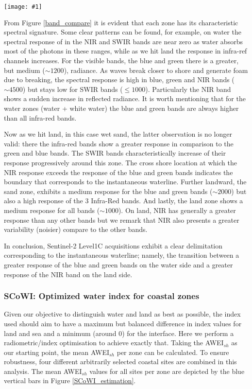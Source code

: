 \documentclass[remotesensing,article,submit,pdftex,moreauthors]{Definitions/mdpi}
\newcommand{\myfigure}[4]{
    \begin{figure*}[h!]
        \centering
        \texttt{[image: \#1]}	 
        \caption{\itshape#2}
        \label{#3}
    \end{figure*} 
}
\begin{document}
\myfigure{img/band_compare_CAPBRETON.png}{Example of the spectral response along the 5 cross shore zones. The instantaneous waterline (land/water limit marker) is our target here.}{band_compare}{1}

From Figure \ref{band_compare} it is evident that each zone has its characteristic spectral signature. Some clear patterns can be found, for example, on water the spectral response of in the NIR and SWIR bands are near zero as water absorbs most of the photons in these ranges, while as we hit land the response in infra-ref channels increases. For the visible bands, the blue and green there is a greater, but medium ($\sim 1200$), radiance. As waves break closer to shore and generate foam due to breaking, the spectral response is high in blue, green and NIR bands ($\sim 4500$) but stays low for SWIR bands ($\le 1000$). Particularly the NIR band shows a sudden increase in reflected radiance. It is worth mentioning that for the water zones (water + white water) the blue and green bands are always higher than all infra-red bands. 

Now as we hit land, in this case wet sand, the latter observation is no longer valid: there the  infra-red bands show a greater response in comparison to the green and blue bands. The SWIR bands characteristically increase of their response progressively around this zone. The cross shore location at which the NIR response exceeds the response of the blue and green bands indicates the boundary that corresponds to the instantaneous waterline. Further landward, the sand zone, exhibits a medium response for the blue and green bands ($\sim 2000$) but also a high response of the 3 Infra-Red bands. And lastly, the land zone shows a medium response for all bands ($\sim 1000$). On land, NIR has generally a greater response than any other bands but we remark that NIR also presents a greater variability (noisier) compare to the other bands.

In conclusion, Sentinel-2 Level1C acquisitions exhibit a clear delimitation corresponding to the instantaneous waterline; namely, the transition between a greater response of the blue and green bands on the water side and a greater response of the NIR band on the land side.

\subsubsection{SCoWI: Optimized water index for coastal zones}\label{SCOWI_sec}
Given our objective to distinguish water and land as best as possible, the index used should aim to have a maximum but balanced difference in index values for land and sea and a minimum (around 0) for the interface. Here we perform a radiometric/index optimisation to achieve exactly that. Taking the AWEI$_{sh}$ as our starting point, the mean AWEI$_{sh}$ per zone can be calculated. To ensure robustness, four different arbitrarily selected coastal sites are combined in this analysis. The mean AWEI$_{sh}$ values for all sites per zone are depicted by the blue vertical bars in Figure \ref{SCoWI_estimation}. 
\end{document}
